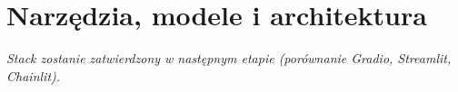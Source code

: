 \section{Narzędzia, modele i architektura}
\textit{Stack zostanie zatwierdzony w następnym etapie (porównanie Gradio, Streamlit, Chainlit).}
